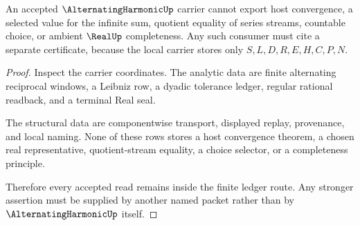 \begin{theorem}
\label{thm:alternating-harmonic-ledger-nonescape}
An accepted $\AlternatingHarmonicUp$ carrier cannot export host convergence, a selected value for the infinite sum, quotient equality of series streams, countable choice, or ambient $\RealUp$ completeness. Any such consumer must cite a separate certificate, because the local carrier stores only $S,L,D,R,E,H,C,P,N$.
\end{theorem}
\begin{proof}
Inspect the carrier coordinates. The analytic data are finite alternating reciprocal windows, a Leibniz row, a dyadic tolerance ledger, regular rational readback, and a terminal Real seal.

The structural data are componentwise transport, displayed replay, provenance, and local naming. None of these rows stores a host convergence theorem, a chosen real representative, quotient-stream equality, a choice selector, or a completeness principle.

Therefore every accepted read remains inside the finite ledger route. Any stronger assertion must be supplied by another named packet rather than by $\AlternatingHarmonicUp$ itself.
\end{proof}




